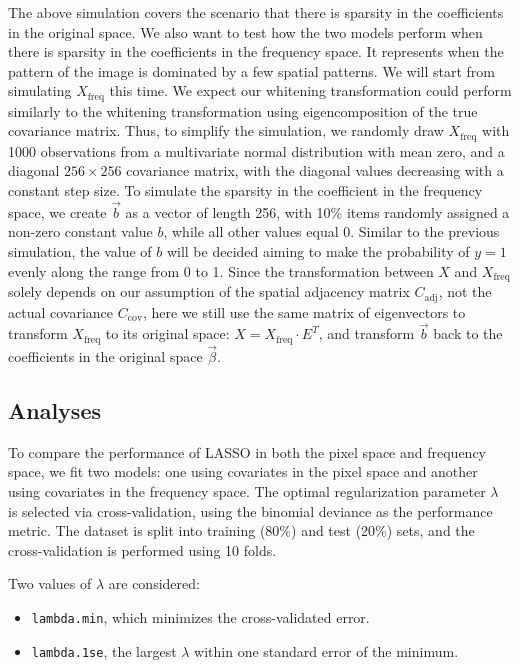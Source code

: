 \documentclass[12pt]{article}
\begin{document}
The above simulation covers the scenario that there is sparsity in the coefficients in the original space. We also want to test how the two models perform when there is sparsity in the coefficients in the frequency space. It represents when the pattern of the image is dominated by a few spatial patterns. We will start from simulating \( X_{\text{freq}} \) this time. We expect our whitening transformation could perform similarly to the whitening transformation using eigencomposition of the true covariance matrix. Thus, to simplify the simulation, we randomly draw \( X_{\text{freq}} \) with 1000 observations from a multivariate normal distribution with mean zero, and a diagonal \( 256 \times 256 \) covariance matrix, with the diagonal values decreasing with a constant step size. To simulate the sparsity in the coefficient in the frequency space, we create \( \vec{b} \) as a vector of length 256, with 10\% items randomly assigned a non-zero constant value \( b \), while all other values equal 0. Similar to the previous simulation, the value of \( b \) will be decided aiming to make the probability of \( y=1 \) evenly along the range from 0 to 1. Since the transformation between \( X \) and \( X_{\text{freq}} \) solely depends on our assumption of the spatial adjacency matrix \( C_{\text{adj}} \), not the actual covariance \( C_{\text{cov}} \), here we still use the same matrix of eigenvectors to transform \( X_{\text{freq}} \) to its original space: \( X = X_{\text{freq}} \cdot E^T \), and transform \( \vec{b} \) back to the coefficients in the original space \( \vec{\beta} \).



\subsection{Analyses}

To compare the performance of LASSO in both the pixel space and frequency space, we fit two models: one using covariates in the pixel space and another using covariates in the frequency space. The optimal regularization parameter \( \lambda \) is selected via cross-validation, using the binomial deviance as the performance metric. The dataset is split into training (80\%) and test (20\%) sets, and the cross-validation is performed using 10 folds.

Two values of \( \lambda \) are considered: 
\begin{itemize}
  \item \texttt{lambda.min}, which minimizes the cross-validated error.
  \item \texttt{lambda.1se}, the largest \( \lambda \) within one standard error of the minimum.
\end{itemize}
\end{document}
